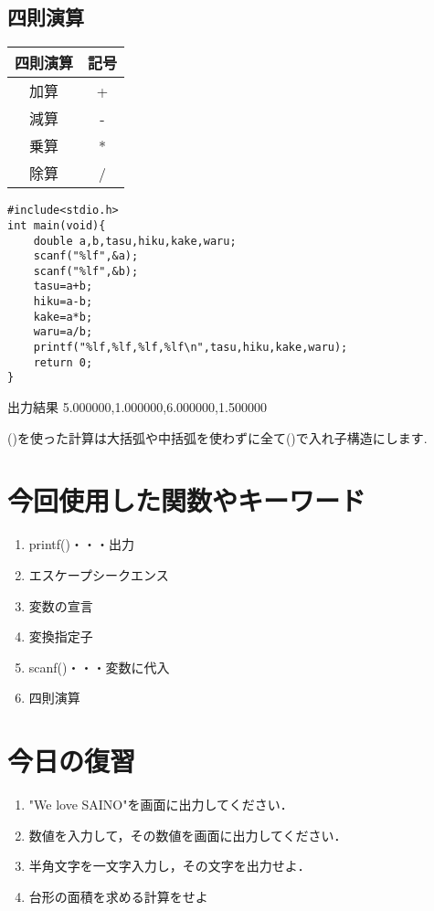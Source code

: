 \documentclass[a4j,titlepage,dvipdfmx]{jsarticle}   %
\begin{document}
\subsection{四則演算}
\begin{table}[h]
\begin{tabular}{|c|c|}
\hline
四則演算 & 記号 \\ \hline
加算 & + \\ \hline
減算 & - \\ \hline
乗算 & * \\ \hline
除算 & / \\ \hline
\end{tabular}
\end{table}
\begin{lstlisting}
#include<stdio.h>
int main(void){
	double a,b,tasu,hiku,kake,waru;
    scanf("%lf",&a);
    scanf("%lf",&b);
    tasu=a+b;
    hiku=a-b;
    kake=a*b;
    waru=a/b;
    printf("%lf,%lf,%lf,%lf\n",tasu,hiku,kake,waru);
    return 0;
}
\end{lstlisting}
\begin{itembox}{出力結果}
5.000000,1.000000,6.000000,1.500000
\end{itembox}
()を使った計算は大括弧や中括弧を使わずに全て()で入れ子構造にします.
\section{今回使用した関数やキーワード}
\begin{enumerate}
\item printf()・・・出力
\item エスケープシークエンス
\item 変数の宣言
\item 変換指定子
\item scanf()・・・変数に代入
\item 四則演算
\end{enumerate}
\section{今日の復習}
\begin{enumerate}
\item "We love SAINO"を画面に出力してください．
\item 数値を入力して，その数値を画面に出力してください．
\item 半角文字を一文字入力し，その文字を出力せよ．
\item 台形の面積を求める計算をせよ
\end{enumerate}
\end{document}
